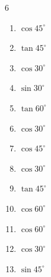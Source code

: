 \begin{multicols}{6}
\begin{enumerate}
  \item $\displaystyle \cos{45^\circ}$


  \item $\displaystyle \tan{45^\circ}$

        \phantom{$\displaystyle =1$}

  \item $\displaystyle \cos{30^\circ}$


  \item $\displaystyle \sin{30^\circ}$


  \item $\displaystyle \tan{60^\circ}$


  \item $\displaystyle \cos{30^\circ}$


  \item $\displaystyle \cos{45^\circ}$


  \item $\displaystyle \cos{30^\circ}$


  \item $\displaystyle \tan{45^\circ}$

        \phantom{$\displaystyle =1$}

  \item $\displaystyle \cos{60^\circ}$


\columnbreak %

  \item $\displaystyle \cos{60^\circ}$


  \item $\displaystyle \cos{30^\circ}$


  \item $\displaystyle \sin{45^\circ}$


\end{enumerate}
\end{multicols}

